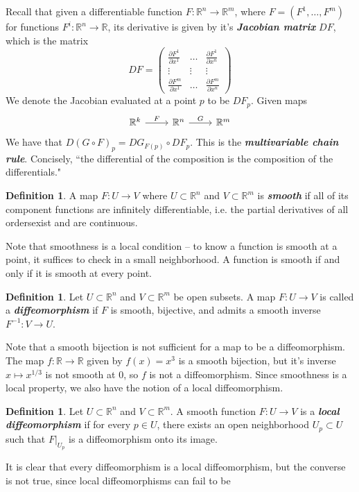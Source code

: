 \documentclass[psamsfonts]{amsart}
\theoremstyle{definition}
\newtheorem{defn}[thm]{Definition}
\theoremstyle{remark}
\newcommand{\R}{\mathbb{R}}
\newcommand{\ib}[1]{\textbf{\textit{#1}}}
\newcommand{\inv}{^{-1}}
\begin{document}
Recall that given a differentiable function $F: \R^n \to \R^m$, where
$F = (F^1, \ldots, F^m)$ for functions $F^i : \R^n \to \R$, its derivative
is given by it's \ib{Jacobian matrix} $DF$, which is the matrix
$$DF = \begin{pmatrix}
\frac{\partial F^1}{\partial x^1} &
\ldots & \frac{\partial F^1}{\partial x^n} \\
\vdots & \vdots & \vdots \\
\frac{\partial F^m}{\partial x^1} &
\ldots & \frac{\partial F^m}{\partial x^n}
\end{pmatrix} $$
We denote the Jacobian evaluated at a point $p$ to be $DF_p$. Given maps
$$\begin{tikzcd}
\R^k \ar[r,"F"] & \R^n \ar[r, "G"] & \R^m
\end{tikzcd}$$
We have that $D(G \circ F)_p = DG_{F(p)} \circ DF_p$. This is the
\ib{multivariable chain rule}. Concisely, ``the differential of the
composition is the composition of the differentials."
%
\begin{defn}
	A map $F : U \to V$ where $U \subset \R^n$ and $V \subset \R^m$ is
	\ib{smooth} if all of its component functions are infinitely
	differentiable, i.e. the partial derivatives of all ordersexist and are
	continuous.
\end{defn}
%
Note that smoothness is a local condition -- to know a function is smooth
at a point, it suffices to check in a small neighborhood. A function is
smooth if and only if it is smooth at every point.
%
\begin{defn}
	Let $U \subset \R^n$ and $V \subset \R^m$ be open subsets. A map
	$F : U \to V$ is called a \ib{diffeomorphism} if $F$ is smooth,
	bijective, and admits a smooth inverse $F\inv : V \to U$.
\end{defn}
%
Note that a smooth bijection is not sufficient for a map to be a
diffeomorphism. The map $f : \R \to \R$ given by $f(x) = x^3$ is a smooth
bijection, but it's inverse $x \mapsto x^{1/3}$ is not smooth at $0$, so
$f$ is not a diffeomorphism. Since smoothness is a local property, we
also have the notion of a local diffeomorphism.
%
\begin{defn}
	Let $U \subset \R^n$ and $V \subset \R^m$. A smooth function
	$F : U \to V$ is a \ib{local diffeomorphism} if for every $p \in U$,
	there exists an open neighborhood $U_p \subset U$ such that
	$F\vert_{U_p}$ is a diffeomorphism onto its image.
\end{defn}
%
It is clear that every diffeomorphism is a local diffeomorphism, but
the converse is not true, since local diffeomorphisms can fail to be
\end{document}
